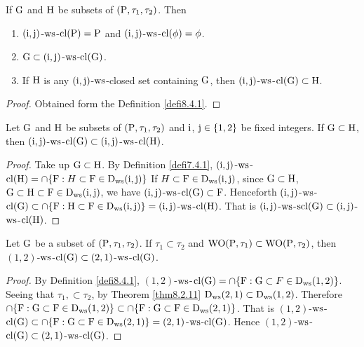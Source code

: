 \begin{thm}\label{thm8.4.1}
If $\mathrm{G}$ and $\mathrm{H}$ be subsets of $(\mathrm{P}, \tau_1, \tau_2 )$. Then
\begin{enumerate}[(1)]
\item $(\mathrm{i}, \mathrm{j})$-$\mathrm{ws}$-$\mathrm{cl}(\mathrm{P})=\mathrm{P}$ and $(\mathrm{i}, \mathrm{j})$-$\mathrm{ws}$-$\mathrm{cl}(\phi)=\phi$.
\item $\mathrm{G} \subset (\mathrm{i}, \mathrm{j})$-$\mathrm{ws}$-$\mathrm{cl}(\mathrm{G})$.
\item If $\mathrm{H}$ is any $(\mathrm{i}, \mathrm{j})$-$\mathrm{ws}$-closed set containing $\mathrm{G}$, then $(\mathrm{i}, \mathrm{j})$-$\mathrm{ws}$-$\mathrm{cl}(\mathrm{G})\subset\mathrm{H}$.
\end{enumerate}
\end{thm}

\begin{proof}
Obtained form the Definition \ref{defi8.4.1}.
\end{proof}

\begin{thm}\label{thm8.4.2}
Let $\mathrm{G}$ and $\mathrm{H}$ be subsets of $(\mathrm{P}, \tau_1, \tau_2 )$ and $\mathrm{i}$, $\mathrm{j}\in\{1, 2\}$ be fixed integers. If $\mathrm{G} \subset \mathrm{H}$, then $(\mathrm{i}, \mathrm{j})$-$\mathrm{ws}$-$\mathrm{cl}(\mathrm{G}) \subset (\mathrm{i}, \mathrm{j})$-$\mathrm{ws}$-$\mathrm{cl}(\mathrm{H})$.
\end{thm}

\begin{proof}
Take up $\mathrm{G}\subset\mathrm{H}$. By Definition \ref{defi7.4.1}, $(\mathrm{i}, \mathrm{j})$-$\mathrm{ws}$-$\mathrm{cl}(\mathrm{H})=\cap \{\mathrm{F}:H\subset\mathrm{F}\in\mathrm{D}_{\mathrm{ws}}(\mathrm{i}, \mathrm{j})\}$ If $H\subset\mathrm{F}\in\mathrm{D}_{\mathrm{ws}} (\mathrm{i},\mathrm{j})$, since $\mathrm{G}\subset\mathrm{H}$, $\mathrm{G}\subset\mathrm{H}\subset\mathrm{F}\in\mathrm{D}_{\mathrm{ws}} (\mathrm{i}, \mathrm{j})$, we have $(\mathrm{i}, \mathrm{j})$-$\mathrm{ws}$-$\mathrm{cl}(\mathrm{G}) \subset \mathrm{F}$. Henceforth $(\mathrm{i}, \mathrm{j})$-$\mathrm{ws}$-$\mathrm{cl}(\mathrm{G}) \subset \cap \{\mathrm{F}:\mathrm{H}\subset\mathrm{F}\in\mathrm{D}_{\mathrm{ws}} (\mathrm{i}, \mathrm{j})\}= (\mathrm{i}, \mathrm{j})$-$\mathrm{ws}$-$\mathrm{cl}(\mathrm{H})$. That is $(\mathrm{i}, \mathrm{j})$-$\mathrm{ws}$-$\mathrm{scl}(\mathrm{G}) \subset (\mathrm{i}, \mathrm{j})$-$\mathrm{ws}$-$\mathrm{cl}(\mathrm{H})$.
\end{proof}

\begin{thm}\label{thm8.4.3}
Let $\mathrm{G}$ be a subset of $(\mathrm{P}, \tau_1, \tau_2 )$. If $\tau_1 \subset \tau_2$ and $\mathrm{WO}(\mathrm{P}, \tau_1 ) \subset \mathrm{WO}(\mathrm{P}, \tau_2 )$, then $(1,2)$-$\mathrm{ws}$-$\mathrm{cl}(\mathrm{G})\subset (2, 1)$-$\mathrm{ws}$-$\mathrm{cl}(\mathrm{G})$.
\end{thm}

\begin{proof}
By Definition \ref{defi8.4.1}, $(1,2)$-$\mathrm{ws}$-$\mathrm{cl}(\mathrm{G})=\cap \{\mathrm{F}:\mathrm{G}\subset F\in\mathrm{D}_{\mathrm{ws}} (1, 2)\}$. Seeing that $\tau_1, \subset \tau_2$, by Theorem \ref{thm8.2.11} $\mathrm{D}_{\mathrm{ws}} (2, 1) \subset \mathrm{D}_{\mathrm{ws}} (1, 2)$. Therefore $\cap \{\mathrm{F}:\mathrm{G}\subset \mathrm{F}\in\mathrm{D}_{\mathrm{ws}} (1, 2)\}\subset \cap \{\mathrm{F}:\mathrm{G}\subset \mathrm{F}\in\mathrm{D}_{\mathrm{ws}} (2,1)\}$. That is $(1, 2)$-$\mathrm{ws}$-$\mathrm{cl}(\mathrm{G})\subset \cap \{\mathrm{F}:\mathrm{G}\subset \mathrm{F}\in\mathrm{D}_{\mathrm{ws}} (2, 1)\}= (2, 1)$-$\mathrm{ws}$-$\mathrm{cl}(\mathrm{G})$. Hence $(1, 2)$-$\mathrm{ws}$-$\mathrm{cl}(\mathrm{G})\subset (2, 1)$-$\mathrm{ws}$-$\mathrm{cl}(\mathrm{G})$.
\end{proof}

